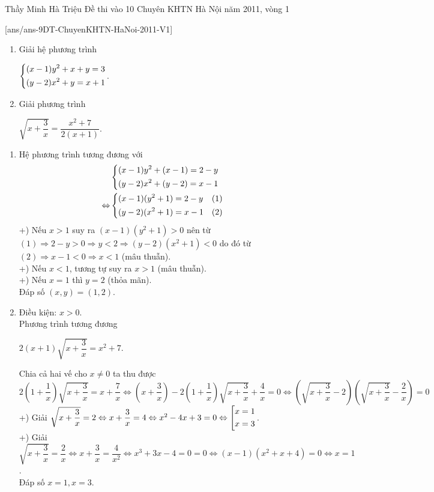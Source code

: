 \begin{name}
{Thầy  Minh Hà Triệu}
{Đề thi vào 10 Chuyên KHTN Hà Nội năm 2011, vòng 1}
\end{name}
\setcounter{ex}{0}
[ans/ans-9DT-ChuyenKHTN-HaNoi-2011-V1]
\begin{ex}%
\begin{enumerate}
	\item Giải hệ phương trình
	\begin{center}
		$\left\{\begin{aligned}&(x-1)y^2+x+y=3\\&(y-2)x^2+y=x+1\end{aligned}\right.$.
	\end{center}
\item Giải phương trình
\begin{center}
	$\sqrt{x+\dfrac{3}{x}}=\dfrac{x^2+7}{2(x+1)}$.
\end{center}
\end{enumerate}	
  \loigiai
    {
   \begin{enumerate}
   	\item Hệ phương trình tương đương với
   	\begin{align*}
   	&\left\{\begin{aligned}&(x-1)y^2+(x-1)=2-y\\&(y-2)x^2+(y-2)=x-1\end{aligned}\right.\\
   	\Leftrightarrow &\left\{\begin{aligned}&(x-1)(y^2+1)=2-y &(1)\\&(y-2)(x^2+1)=x-1&(2)\end{aligned}\right.
   	\end{align*}
   	+) Nếu $x>1$ suy ra $(x-1)(y^2+1)>0$ nên từ $(1)\Rightarrow 2-y>0\Rightarrow y<2\Rightarrow (y-2)(x^2+1)<0$ do đó từ $(2)\Rightarrow x-1<0\Rightarrow x<1$ (mâu thuẫn).\\
   	+) Nếu $x<1$, tương tự suy ra $x>1$ (mâu thuẫn).\\
   	+) Nếu $x=1$ thì $y=2$ (thỏa mãn).\\
   	Đáp số $(x,y)=(1,2)$.
   	\item Điều kiện: $x>0$.\\
   	Phương trình tương đương
   	\begin{center}
   		$2(x+1)\sqrt{x+\dfrac{3}{x}}=x^2+7$.
   	\end{center}
   Chia cả hai vế cho $x\neq 0$ ta thu được\\
   $2(1+\dfrac{1}{x})\sqrt{x+\dfrac{3}{x}}=x+\dfrac{7}{x}\Leftrightarrow (x+\dfrac{3}{x})- 2(1+\dfrac{1}{x})\sqrt{x+\dfrac{3}{x}}+\dfrac{4}{x}=0\Leftrightarrow \left(\sqrt{x+\dfrac{3}{x}}-2 \right)\left(\sqrt{x+\dfrac{3}{x}}-\dfrac{2}{x} \right)  =0$\\
   +) Giải  $\sqrt{x+\dfrac{3}{x}}=2\Leftrightarrow x+\dfrac{3}{x}=4\Leftrightarrow x^2-4x+3=0\Leftrightarrow\left[\begin{aligned}x=1\\x=3\end{aligned}\right.$.\\
   +) Giải  $\sqrt{x+\dfrac{3}{x}}=\dfrac{2}{x}\Leftrightarrow x+\dfrac{3}{x}=\dfrac{4}{x^2}\Leftrightarrow x^3+3x-4=0=0\Leftrightarrow (x-1)(x^2+x+4)=0\Leftrightarrow x=1$.\\
   Đáp số $x=1,x=3$.
   \end{enumerate}
    }
\end{ex}
